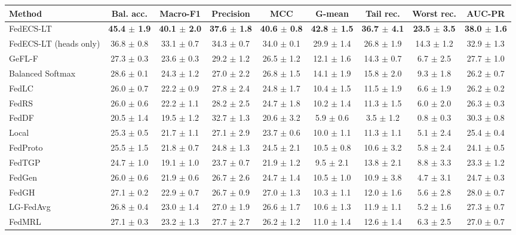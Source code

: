\begin{tabular}{lcccccccc}
\toprule
Method & Bal. acc. & Macro-F1 & Precision & MCC & G-mean & Tail rec. & Worst rec. & AUC-PR\\
\midrule
FedECS-LT & \textbf{45.4 $\pm$ 1.9} & \textbf{40.1 $\pm$ 2.0} & \textbf{37.6 $\pm$ 1.8} & \textbf{40.6 $\pm$ 0.8} & \textbf{42.8 $\pm$ 1.5} & \textbf{36.7 $\pm$ 4.1} & \textbf{23.5 $\pm$ 3.5} & \textbf{38.0 $\pm$ 1.6}\\
FedECS-LT (heads only) & 36.8 $\pm$ 0.8 & 33.1 $\pm$ 0.7 & 34.3 $\pm$ 0.7 & 34.0 $\pm$ 0.1 & 29.9 $\pm$ 1.4 & 26.8 $\pm$ 1.9 & 14.3 $\pm$ 1.2 & 32.9 $\pm$ 1.3\\
GeFL-F & 27.3 $\pm$ 0.3 & 23.6 $\pm$ 0.3 & 29.2 $\pm$ 1.2 & 26.5 $\pm$ 1.2 & 12.1 $\pm$ 1.6 & 14.3 $\pm$ 0.7 & 6.7 $\pm$ 2.5 & 27.7 $\pm$ 1.0\\
Balanced Softmax & 28.6 $\pm$ 0.1 & 24.3 $\pm$ 1.2 & 27.0 $\pm$ 2.2 & 26.8 $\pm$ 1.5 & 14.1 $\pm$ 1.9 & 15.8 $\pm$ 2.0 & 9.3 $\pm$ 1.8 & 26.2 $\pm$ 0.7\\
FedLC & 26.0 $\pm$ 0.7 & 22.2 $\pm$ 0.9 & 27.8 $\pm$ 2.4 & 24.8 $\pm$ 1.7 & 10.4 $\pm$ 1.5 & 11.5 $\pm$ 1.9 & 6.6 $\pm$ 1.9 & 26.2 $\pm$ 0.2\\
FedRS & 26.0 $\pm$ 0.6 & 22.2 $\pm$ 1.1 & 28.2 $\pm$ 2.5 & 24.7 $\pm$ 1.8 & 10.2 $\pm$ 1.4 & 11.3 $\pm$ 1.5 & 6.0 $\pm$ 2.0 & 26.3 $\pm$ 0.3\\
FedDF & 20.5 $\pm$ 1.4 & 19.5 $\pm$ 1.2 & 32.7 $\pm$ 1.3 & 20.6 $\pm$ 3.2 & 5.9 $\pm$ 0.6 & 3.5 $\pm$ 1.2 & 0.8 $\pm$ 0.3 & 30.3 $\pm$ 0.8\\
Local & 25.3 $\pm$ 0.5 & 21.7 $\pm$ 1.1 & 27.1 $\pm$ 2.9 & 23.7 $\pm$ 0.6 & 10.0 $\pm$ 1.1 & 11.3 $\pm$ 1.1 & 5.1 $\pm$ 2.4 & 25.4 $\pm$ 0.4\\
FedProto & 25.5 $\pm$ 1.5 & 21.8 $\pm$ 0.7 & 24.8 $\pm$ 1.3 & 24.5 $\pm$ 2.1 & 10.5 $\pm$ 0.8 & 10.6 $\pm$ 3.2 & 5.8 $\pm$ 2.4 & 24.1 $\pm$ 0.5\\
FedTGP & 24.7 $\pm$ 1.0 & 19.1 $\pm$ 1.0 & 23.7 $\pm$ 0.7 & 21.9 $\pm$ 1.2 & 9.5 $\pm$ 2.1 & 13.8 $\pm$ 2.1 & 8.8 $\pm$ 3.3 & 23.3 $\pm$ 1.2\\
FedGen & 26.0 $\pm$ 0.6 & 21.9 $\pm$ 0.6 & 26.7 $\pm$ 2.6 & 24.7 $\pm$ 1.4 & 10.5 $\pm$ 1.0 & 10.9 $\pm$ 3.8 & 4.7 $\pm$ 3.1 & 24.7 $\pm$ 0.3\\
FedGH & 27.1 $\pm$ 0.2 & 22.9 $\pm$ 0.7 & 26.7 $\pm$ 0.9 & 27.0 $\pm$ 1.3 & 10.3 $\pm$ 1.1 & 12.0 $\pm$ 1.6 & 5.6 $\pm$ 2.8 & 28.0 $\pm$ 0.7\\
LG-FedAvg & 26.8 $\pm$ 0.4 & 23.0 $\pm$ 1.4 & 27.0 $\pm$ 1.9 & 26.6 $\pm$ 1.7 & 10.6 $\pm$ 1.3 & 11.9 $\pm$ 1.1 & 5.2 $\pm$ 1.6 & 27.3 $\pm$ 0.7\\
FedMRL & 27.1 $\pm$ 0.3 & 23.2 $\pm$ 1.3 & 27.7 $\pm$ 2.7 & 26.2 $\pm$ 1.2 & 11.0 $\pm$ 1.4 & 12.6 $\pm$ 1.4 & 6.3 $\pm$ 2.5 & 27.0 $\pm$ 0.7\\
\bottomrule
\end{tabular}
